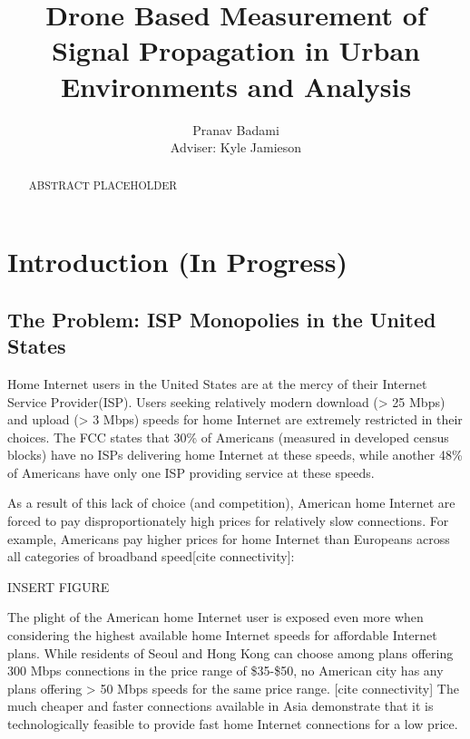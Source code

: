 \documentclass[pageno]{jpaper}
\begin{document}
\title{
Drone Based Measurement of Signal Propagation in Urban Environments and Analysis}

\author{Pranav Badami\\Adviser: Kyle Jamieson}

\date{}
\maketitle

\thispagestyle{empty}
\doublespacing

\begin{abstract}
ABSTRACT PLACEHOLDER
\end{abstract}

\section{Introduction (In Progress)}
\subsection{The Problem: ISP Monopolies in the United States}
Home Internet users in the United States are at the mercy of their Internet Service Provider(ISP). Users seeking relatively modern download (> 25 Mbps) and upload (> 3 Mbps) speeds for home Internet are extremely restricted in their choices. The FCC states that 30\% of Americans (measured in developed census blocks) have no ISPs delivering home Internet at these speeds, while another 48\% of Americans have only one ISP providing service at these speeds\cite{fcc15}. 

As a result of this lack of choice (and competition), American home Internet are forced to pay disproportionately high prices for relatively slow connections. For example, Americans pay higher prices for home Internet than Europeans across all categories of broadband speed[cite connectivity]:

INSERT FIGURE

The plight of the American home Internet user is exposed even more when considering the highest available home Internet speeds for affordable Internet plans. While residents of Seoul and Hong Kong can choose among plans offering 300 Mbps connections in the price range of \$35-\$50, no American city has any plans offering > 50 Mbps speeds for the same price range. [cite connectivity] The much cheaper and faster connections available in Asia demonstrate that it is technologically feasible to provide fast home Internet connections for a low price. 
\end{document}
